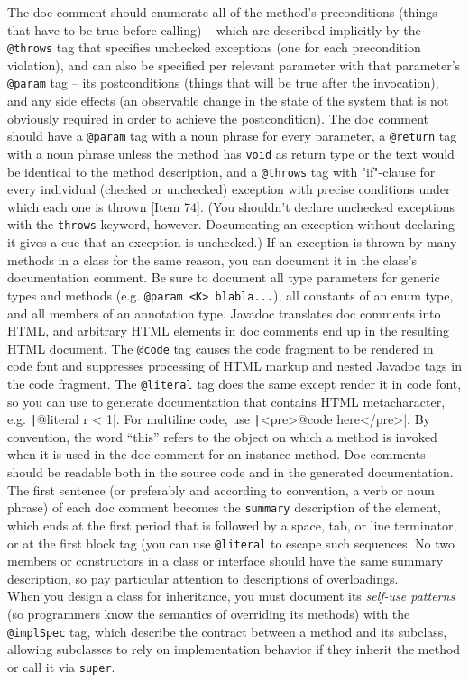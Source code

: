 \documentclass[table, xcdraw]{article}%
\begin{document}
The doc comment should enumerate all of the method’s preconditions (things that have to be true before calling) -- which are described implicitly by the \texttt{@throws} tag that specifies unchecked exceptions (one for each precondition violation), and can also be specified per relevant parameter with that parameter's \texttt{@param} tag -- its postconditions (things that will be true after the invocation), and any side effects (an observable change in the state of the system that is not obviously required in order to achieve the postcondition). The doc comment should have a \texttt{@param} tag with a noun phrase for every parameter, a \texttt{@return} tag with a noun phrase unless the method has \texttt{void} as return type or the text would be identical to the method description, and a \texttt{@throws} tag with "if"-clause for every individual (checked or unchecked) exception with precise conditions under which each one is thrown [Item 74]. (You shouldn't declare unchecked exceptions with the \texttt{throws} keyword, however. Documenting an exception without declaring it gives a cue that an exception is unchecked.) If an exception is thrown by many methods in a class for the same reason, you can document it in the class’s documentation comment. Be sure to document all type parameters for generic types and methods (e.g. \texttt{@param <K> blabla...}), all constants of an enum type, and all members of an annotation type. Javadoc translates doc comments into HTML, and arbitrary HTML elements in doc comments end up in the resulting HTML document. The \texttt{@code} tag causes the code fragment to be rendered in code font and suppresses processing of HTML markup and nested Javadoc tags in the code fragment. The \texttt{@literal} tag does the same except render it in code font, so you can use to generate documentation that contains HTML metacharacter, e.g. \texttt|{@literal r < 1}|. For multiline code, use \texttt|<pre>{@code here}</pre>|. By convention, the word “this” refers to the object on which a method is invoked when it is used in the doc comment for an instance method. Doc comments should be readable both in the source code and in the generated documentation. The first sentence (or preferably and according to convention, a verb or noun phrase) of each doc comment becomes the \texttt{summary} description of the element, which ends at the first period that is followed by a space, tab, or line terminator, or at the first block tag (you can use \texttt{@literal} to escape such sequences. No two members or constructors in a class or interface should have the same summary description, so pay particular attention to descriptions of overloadings.\\
When you design a class for inheritance, you must document its \emph{self-use patterns} (so programmers know the semantics of overriding its methods) with the \texttt{@implSpec} tag, which describe the contract between a method and its subclass, allowing subclasses to rely on implementation behavior if they inherit the method or call it via \texttt{super}.
\end{document}
